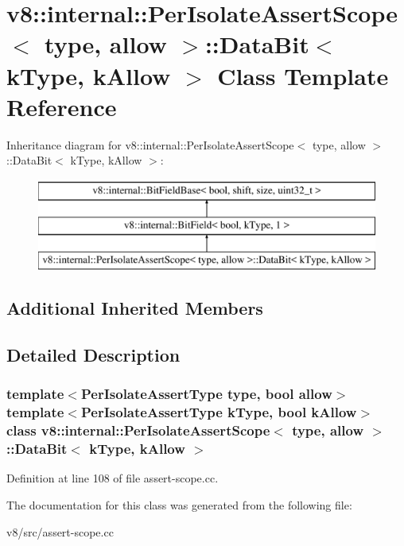\hypertarget{classv8_1_1internal_1_1PerIsolateAssertScope_1_1DataBit}{}\section{v8\+:\+:internal\+:\+:Per\+Isolate\+Assert\+Scope$<$ type, allow $>$\+:\+:Data\+Bit$<$ k\+Type, k\+Allow $>$ Class Template Reference}
\label{classv8_1_1internal_1_1PerIsolateAssertScope_1_1DataBit}
Inheritance diagram for v8\+:\+:internal\+:\+:Per\+Isolate\+Assert\+Scope$<$ type, allow $>$\+:\+:Data\+Bit$<$ k\+Type, k\+Allow $>$\+:\begin{figure}[H]
\begin{center}
\leavevmode
\includegraphics[height=3.000000cm]{classv8_1_1internal_1_1PerIsolateAssertScope_1_1DataBit}
\end{center}
\end{figure}
\subsection*{Additional Inherited Members}


\subsection{Detailed Description}
\subsubsection*{template$<$Per\+Isolate\+Assert\+Type type, bool allow$>$\newline
template$<$Per\+Isolate\+Assert\+Type k\+Type, bool k\+Allow$>$\newline
class v8\+::internal\+::\+Per\+Isolate\+Assert\+Scope$<$ type, allow $>$\+::\+Data\+Bit$<$ k\+Type, k\+Allow $>$}



Definition at line 108 of file assert-\/scope.\+cc.



The documentation for this class was generated from the following file\+:\begin{DoxyCompactItemize}
\item 
v8/src/assert-\/scope.\+cc\end{DoxyCompactItemize}
